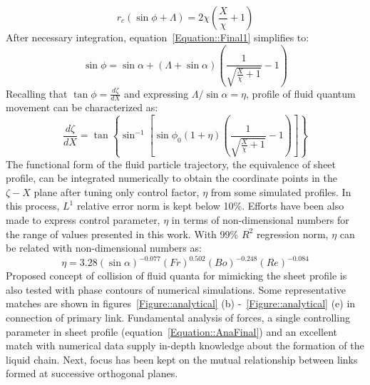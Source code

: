 \begin{equation}\label{Equation::Final1}
r_c\left(\sin\phi + \Lambda\right) = 2\chi\left(\frac{X}{\chi} + 1\right)
\end{equation} 
After necessary integration, equation~\ref{Equation::Final1} simplifies to:
\begin{equation}
\sin\phi  = \sin\alpha + \left(\Lambda + \sin\alpha\right)\left(\frac{1}{\sqrt{\frac{X}{\chi} + 1}} - 1\right)	
\end{equation}
Recalling that $\tan\phi = \frac{d\zeta}{dX}$ and expressing $\Lambda/\sin\alpha = \eta$, profile of fluid quantum movement can be characterized as:
\begin{equation}
\label{Equation::AnaFinal}
\frac{d\zeta}{dX} = \tan\left\lbrace\sin^{-1}\left[ \sin\phi_0\left(1 + \eta\right)\left(\frac{1}{\sqrt{\frac{X}{\chi} + 1}} - 1\right) \right]\right\rbrace
\end{equation}
The functional form of the fluid particle trajectory, the equivalence of sheet profile, can be integrated numerically to obtain the coordinate points in the $\zeta-X$ plane after tuning only control factor, $\eta$ from some simulated profiles. In this process, $L^1$ relative error norm is kept below 10\%. Efforts have been also made to express control parameter, $\eta$ in terms of non-dimensional numbers for the range of values presented in this work. With 99\% $R^2$ regression norm, $\eta$ can be related with non-dimensional numbers as:
\begin{equation}\label{Equation::eta}
\eta = 3.28(\sin\alpha)^{-0.077}(Fr)^{0.502}(Bo)^{-0.248}\left(Re\right)^{-0.084}
\end{equation}
Proposed concept of collision of fluid quanta for mimicking the sheet profile is also tested with phase contours of numerical simulations. Some representative matches are shown in figures~\ref{Figure::analytical} (b) -~\ref{Figure::analytical} (e) in connection of primary link. Fundamental analysis of forces, a single controlling parameter in sheet profile (equation~\ref{Equation::AnaFinal}) and an excellent match with numerical data supply in-depth knowledge about the formation of the liquid chain. Next, focus has been kept on the mutual relationship between links formed at successive orthogonal planes. 
